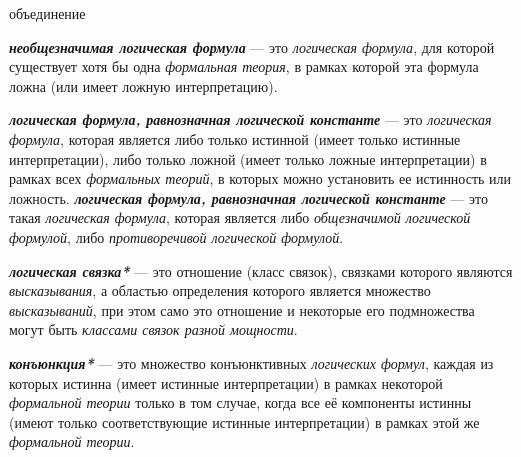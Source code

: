 \begin{SCn}
\begin{scnreltoset}{объединение}
\end{scnreltoset}
\end{SCn}

\textbf{\textit{необщезначимая логическая формула}} --- это \textit{логическая формула}, для которой существует хотя бы одна \textit{формальная теория}, в рамках которой эта формула ложна (или имеет ложную интерпретацию).

\textbf{\textit{логическая формула, равнозначная логической константе}} --- это \textit{логическая формула}, которая является либо только истинной (имеет только истинные интерпретации), либо только ложной (имеет только ложные интерпретации) в рамках всех \textit{формальных теорий}, в которых можно установить ее истинность или ложность.
\textbf{\textit{логическая формула, равнозначная логической константе}} --- это такая \textit{логическая формула}, которая является либо \textit{общезначимой логической формулой}, либо \textit{противоречивой логической формулой}.

\begin{SCn}
\end{SCn}

\textbf{\textit{логическая связка*}} --- это отношение (класс связок), связками которого являются \textit{высказывания}, а областью определения которого является множество \textit{высказываний}, при этом само это отношение и некоторые его подмножества могут быть \textit{классами связок разной мощности}.

\begin{SCn}
\end{SCn}

\textbf{\textit{конъюнкция*}} --- это множество конъюнктивных \textit{логических формул}, каждая из которых истинна (имеет истинные интерпретации) в рамках некоторой \textit{формальной теории} только в том случае, когда все её компоненты истинны (имеют только соответствующие истинные интерпретации) в рамках этой же \textit{формальной теории}. 

